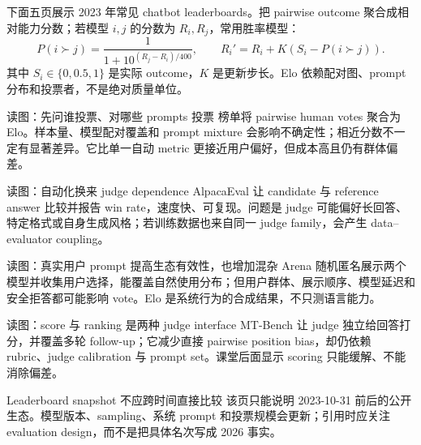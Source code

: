 下面五页展示 2023 年常见 chatbot leaderboards。把 pairwise outcome 聚合成相对能力分数；若模型 $i,j$ 的分数为 $R_i,R_j$，常用胜率模型：
\[
P(i\succ j)=\frac{1}{1+10^{(R_j-R_i)/400}},\qquad
R_i' = R_i + K(S_i-P(i\succ j)).
\]
其中 $S_i\in\{0,0.5,1\}$ 是实际 outcome，$K$ 是更新步长。Elo 依赖配对图、prompt 分布和投票者，不是绝对质量单位。


\begin{knowledgebox}{读图：先问谁投票、对哪些 prompts 投票}
榜单将 pairwise human votes 聚合为 Elo。样本量、模型配对覆盖和 prompt mixture 会影响不确定性；相近分数不一定有显著差异。它比单一自动 metric 更接近用户偏好，但成本高且仍有群体偏差。
\end{knowledgebox}


\begin{knowledgebox}{读图：自动化换来 judge dependence}
AlpacaEval 让 candidate 与 reference answer 比较并报告 win rate，速度快、可复现。问题是 judge 可能偏好长回答、特定格式或自身生成风格；若训练数据也来自同一 judge family，会产生 data--evaluator coupling。
\end{knowledgebox}


\begin{knowledgebox}{读图：真实用户 prompt 提高生态有效性，也增加混杂}
Arena 随机匿名展示两个模型并收集用户选择，能覆盖自然使用分布；但用户群体、展示顺序、模型延迟和安全拒答都可能影响 vote。Elo 是系统行为的合成结果，不只测语言能力。
\end{knowledgebox}


\begin{knowledgebox}{读图：score 与 ranking 是两种 judge interface}
MT-Bench 让 judge 独立给回答打分，并覆盖多轮 follow-up；它减少直接 pairwise position bias，却仍依赖 rubric、judge calibration 与 prompt set。课堂后面显示 scoring 只能缓解、不能消除偏差。
\end{knowledgebox}


\begin{warningbox}{Leaderboard snapshot 不应跨时间直接比较}
该页只能说明 2023-10-31 前后的公开生态。模型版本、sampling、系统 prompt 和投票规模会更新；引用时应关注 evaluation design，而不是把具体名次写成 2026 事实。
\end{warningbox}


